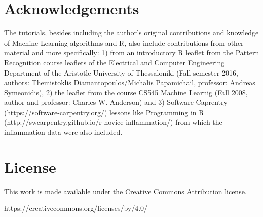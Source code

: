 \section{Acknowledgements}

The tutorials, besides including the author's original contributions and knowledge of Machine Learning algorithms and R, also include contributions from other material and more specifically: 1) from an introductory R leaflet from the Pattern Recognition course leaflets of the Electrical and Computer Engineering Department of the Aristotle University of Thessaloniki (Fall semester 2016, authors: Themistoklis Diamantopoulos/Michalis Papamichail, professor: Andreas Symeonidis), 2) the leaflet from the course CS545 Machine Learnig (Fall 2008, author and professor: Charles W. Anderson) and 3) Software Caprentry (https://software-carpentry.org/) lessons like Programming in R (http://swcarpentry.github.io/r-novice-inflammation/) from which the inflammation data were also included.

\section{License}

This work is made available under the Creative Commons Attribution license.

https://creativecommons.org/licenses/by/4.0/
